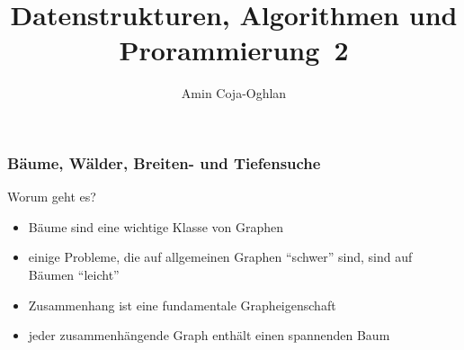\documentclass[aspectratio=1610, 11pt]{beamer}
\title{Datenstrukturen, Algorithmen und Prorammierung~2}
\author[A.~Coja-Oghlan]{Amin Coja-Oghlan}
\institute[DAP2]{Lehrstuhl Informatik 2\\Fakult\"at f\"ur Informatik}
\newcommand{\mytitle}{B\"aume, W\"alder, Breiten- und Tiefensuche}
\begin{document}
\frame[plain]{\titlepage}

\begin{frame}\frametitle{\mytitle}
	\begin{exampleblock}{Worum geht es?}
		\begin{itemize}
			\item B\"aume sind eine wichtige Klasse von Graphen
			\item einige Probleme, die auf allgemeinen Graphen ``schwer'' sind, sind auf B\"aumen ``leicht''
			\item Zusammenhang ist eine fundamentale Grapheigenschaft
			\item jeder zusammenh\"angende Graph enth\"alt einen spannenden Baum
		\end{itemize}
	\end{exampleblock}
\end{frame}
\end{document}
